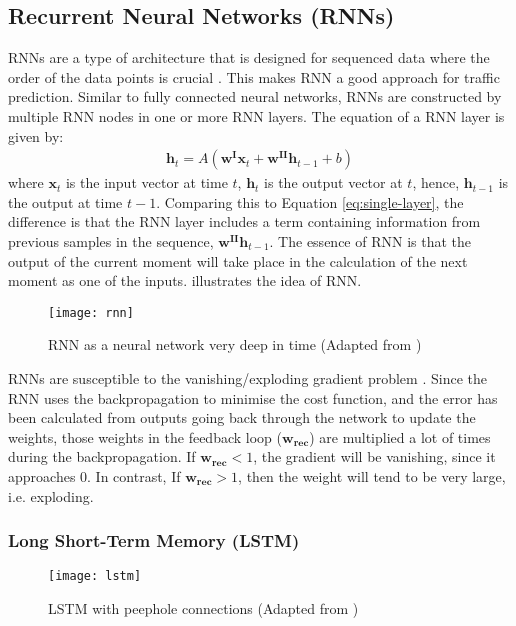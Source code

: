 \subsection{Recurrent Neural Networks (RNNs)}

RNNs are a type of architecture that is designed for sequenced data where the order of the data points is crucial \cite{lipton2015critical}. 
This makes RNN a good approach for traffic prediction. 
Similar to fully connected neural networks, RNNs are constructed by multiple RNN nodes in one or more RNN layers. The equation of a RNN layer is given by:
\begin{gather}
    \mathbf{h}_t = A(\mathbf{w^Ix}_t + \mathbf{w^{II}h}_{t-1} + b) \label{eq:RNN}
\end{gather}
where $\mathbf{x}_t$ is the input vector at time $t$, $\mathbf{h}_t$ is the output vector at $t$, hence, $\mathbf{h}_{t-1}$ is the output at time $t-1$. 
Comparing this to Equation \ref{eq:single-layer}, the difference is that the RNN layer includes a term containing information from previous samples in the sequence, $\mathbf{w^{II}h}_{t-1}$.
The essence of RNN is that the output of the current moment will take place in the calculation of the next moment as one of the inputs. 
 illustrates the idea of RNN.

\begin{figure}[!htb]
    \centering
    \texttt{[image: rnn]}
    \caption{RNN as a neural network very deep in time (Adapted from \cite{rnnplot})}
    \label{Figure:RNN-structure}
\end{figure}

RNNs are susceptible to the vanishing/exploding gradient problem \cite{ribeiro2020exploding}. 
Since the RNN uses the backpropagation to minimise the cost function, and the error has been calculated from outputs going back through the network to update the weights, 
those weights in the feedback loop ($\mathbf{w_{rec}}$) are multiplied a lot of times during the backpropagation. 
If $\mathbf{w_{rec}} < 1$, the gradient will be vanishing, since it approaches 0. In contrast, If $\mathbf{w_{rec}} > 1$, then the weight will tend to be very large, i.e. exploding. 

\subsubsection{Long Short-Term Memory (LSTM)}

\begin{figure}[!htb]
    \centering
    \texttt{[image: lstm]}
    \caption{LSTM with peephole connections (Adapted from \cite{rnnplot})}
    \label{Figure:LSTM-structure}
\end{figure}

